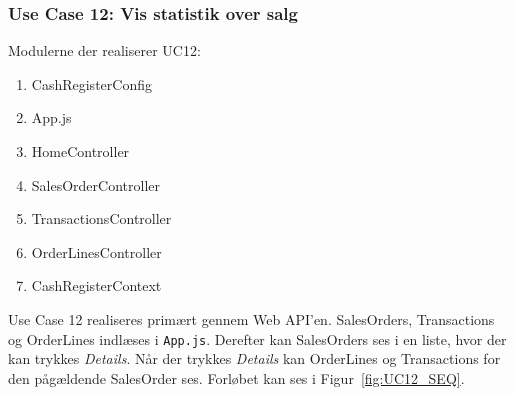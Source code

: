 \subsubsection{Use Case 12: Vis statistik over salg}
Modulerne der realiserer UC12:
\begin{enumerate}
	\item CashRegisterConfig
	\item App.js
	\item HomeController
	\item SalesOrderController
	\item TransactionsController
	\item OrderLinesController
	\item CashRegisterContext
\end{enumerate}

Use Case 12 realiseres primært gennem Web API'en. SalesOrders, Transactions og OrderLines indlæses i \texttt{App.js}. Derefter kan SalesOrders ses i en liste, hvor der kan trykkes \textit{Details}. Når der trykkes \textit{Details} kan OrderLines og Transactions for den pågældende SalesOrder ses. Forløbet kan ses i Figur~\ref{fig:UC12_SEQ}.

